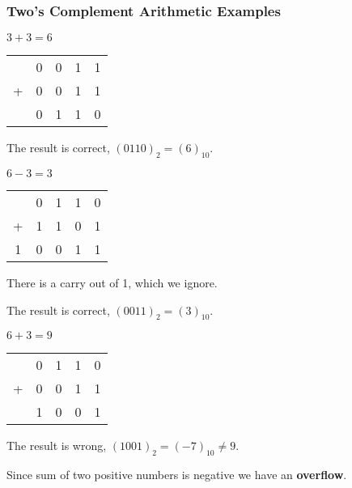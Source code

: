 \begin{frame}\frametitle{Two's Complement Arithmetic Examples}
\begin{multicols}{3}
 $3+3 = 6$
 \vspace{0.5cm}
\begin{center}
    \begin{tabular}{ ccccc}
& 0 & 0 & 1 & 1 \\
+ &0 & 0 & 1 & 1 \\ \hline
&0 & 1 & 1 & 0 \\ 
\end{tabular}
\end{center}


The result is correct, $(0110)_2=(6)_{10}$.

\columnbreak
$6-3 = 3$
\vspace{0.5cm}
\begin{center}
    \begin{tabular}{ ccccc}
 & 0 & 1 & 1 & 0 \\
+ & 1 & 1 & 0 & 1 \\ \hline
1& 0 & 0 & 1 & 1 \\ 
\end{tabular}
\end{center}
{\footnotesize There is a carry out of 1, which we ignore.}


The result is correct, $(0011)_2=(3)_{10}$.

\columnbreak
$6+3 = 9$
\vspace{0.5cm}
\begin{center}
    \begin{tabular}{ ccccc}
 & 0 & 1 & 1 & 0 \\
+ &0 & 0 & 1 & 1 \\ \hline
 & 1 & 0 & 0 & 1 \\ 
\end{tabular}
\end{center}


 The result is wrong, $(1001)_2 = (-7)_{10} \neq 9$. 

{\footnotesize Since sum of two positive numbers is negative we have an \textbf{overflow}.}
    
\end{multicols}


\end{frame}

